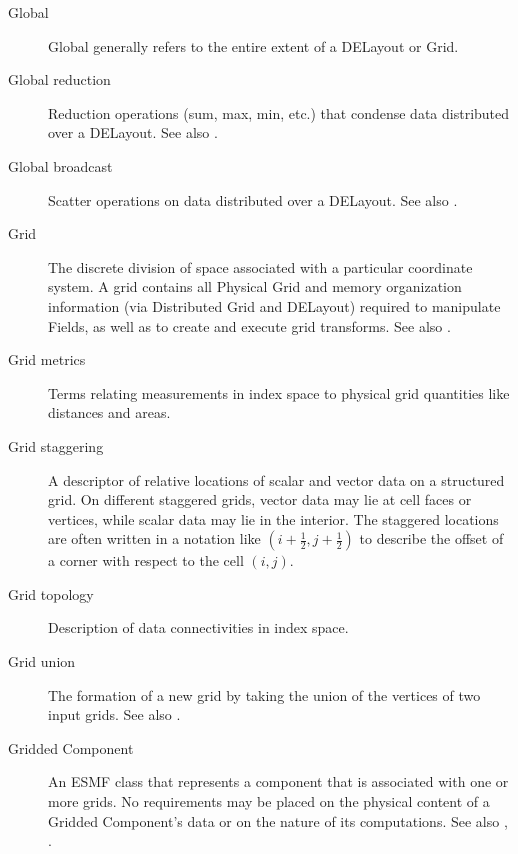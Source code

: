 \begin{description}
\item[Global] \label{glos:GlobDomain}
  Global generally refers to the entire extent of a DELayout or Grid.

\item[Global reduction] \label{glos:GlobReduction} 
  Reduction operations (sum, max, min, etc.) that condense data distributed
  over a DELayout.
  See also .

\item[Global broadcast] \label{glos:GlobBroadcast}
  Scatter operations on data distributed over a DELayout.
  See also .

\item[Grid] \label{glos:Grid} The discrete division of space associated with
  a particular coordinate system.  A grid contains all Physical Grid and memory 
  organization information (via Distributed Grid and DELayout) required to manipulate 
  Fields, as well as to create and execute grid transforms. 
  See also . 

\item[Grid metrics] \label{glos:GridMetrics} Terms relating measurements 
  in index space to physical grid quantities like distances and areas.

\item[Grid staggering] \label{glos:GridStagger} 
  A descriptor of relative locations
  of scalar and vector data on a structured grid. On different
  staggered grids, vector data may lie at cell faces or vertices,
  while scalar data may lie in the interior. The staggered locations
  are often written in a notation like $(i+\frac12,j+\frac12)$ to
  describe the offset of a corner with respect to the cell $(i,j)$.

\item[Grid topology] \label{glos:GridTopo} Description of data 
  connectivities in index space.

\item[Grid union] \label{glos:GridUnion} The formation of a new grid
  by taking the union of the vertices of two input grids.
  See also . 

\item[Gridded Component] \label{glos:GridComp}
  An ESMF class that represents a component that is associated with one 
  or more grids.  No requirements 
  may be placed on the physical content of a Gridded Component's data or 
  on the nature of its computations. See also ,
  . 


\end{description}
